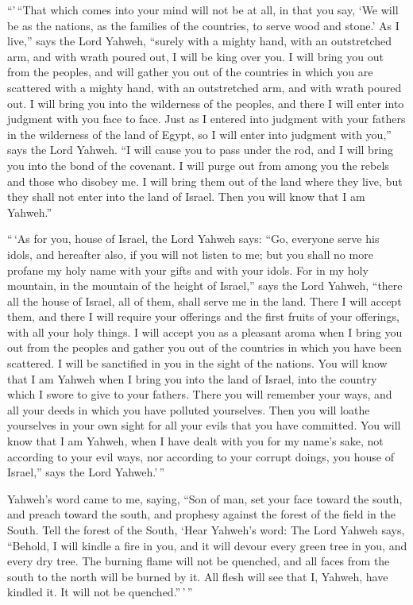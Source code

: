  ``'\,``That which comes into your mind will not be at
all, in that you say, `We will be as the nations, as the families of the
countries, to serve wood and stone.'  As I live,'' says
the Lord Yahweh, ``surely with a mighty hand, with an outstretched arm,
and with wrath poured out, I will be king over you.  I
will bring you out from the peoples, and will gather you out of the
countries in which you are scattered with a mighty hand, with an
outstretched arm, and with wrath poured out.  I will
bring you into the wilderness of the peoples, and there I will enter
into judgment with you face to face.  Just as I entered
into judgment with your fathers in the wilderness of the land of Egypt,
so I will enter into judgment with you,'' says the Lord Yahweh.
 ``I will cause you to pass under the rod, and I will
bring you into the bond of the covenant.  I will purge
out from among you the rebels and those who disobey me. I will bring
them out of the land where they live, but they shall not enter into the
land of Israel. Then you will know that I am Yahweh.''

 ``\,`As for you, house of Israel, the Lord Yahweh says:
``Go, everyone serve his idols, and hereafter also, if you will not
listen to me; but you shall no more profane my holy name with your gifts
and with your idols.  For in my holy mountain, in the
mountain of the height of Israel,'' says the Lord Yahweh, ``there all
the house of Israel, all of them, shall serve me in the land. There I
will accept them, and there I will require your offerings and the first
fruits of your offerings, with all your holy things.  I
will accept you as a pleasant aroma when I bring you out from the
peoples and gather you out of the countries in which you have been
scattered. I will be sanctified in you in the sight of the nations.
 You will know that I am Yahweh when I bring you into the
land of Israel, into the country which I swore to give to your fathers.
 There you will remember your ways, and all your deeds in
which you have polluted yourselves. Then you will loathe yourselves in
your own sight for all your evils that you have committed.
 You will know that I am Yahweh, when I have dealt with
you for my name's sake, not according to your evil ways, nor according
to your corrupt doings, you house of Israel,'' says the Lord
Yahweh.'\,''

 Yahweh's word came to me, saying,  ``Son
of man, set your face toward the south, and preach toward the south, and
prophesy against the forest of the field in the South. 
Tell the forest of the South, `Hear Yahweh's word: The Lord Yahweh says,
``Behold, I will kindle a fire in you, and it will devour every green
tree in you, and every dry tree. The burning flame will not be quenched,
and all faces from the south to the north will be burned by it.
 All flesh will see that I, Yahweh, have kindled it. It
will not be quenched.''\,'\,''


